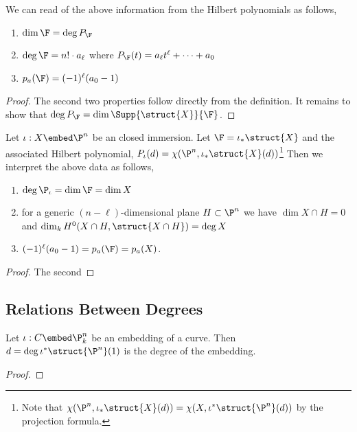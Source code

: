\documentclass[12pt]{article}
\begin{document}
\begin{lemma}
We can read of the above information from the Hilbert polynomials as follows,
\begin{enumerate}
\item $\dim{\F} = \deg{P_\F}$
\item $\deg{\F} = n! \cdot a_\ell$ where $P_\F(t) = a_\ell t^\ell + \cdots + a_0$
\item $p_a(\F) = (-1)^\ell (a_0 - 1)$
\end{enumerate}
\end{lemma}

\begin{proof}
The second two properties follow directly from the definition. It remains to show that $\deg{P_\F} = \dim{\Supp{\struct{X}}{\F}}$. 
\end{proof}

\begin{lemma}
Let $\iota : X \embed \P^n$ be an closed immersion. Let $\F = \iota_* \struct{X}$ and the associated Hilbert polynomial, $P_\iota(d) = \chi(\P^n, \iota_* \struct{X}(d))$\footnote{Note that $\chi(\P^n, \iota_* \struct{X}(d)) = \chi(X, \iota^* \struct{\P^n}(d))$ by the projection formula.} Then we interpret the above data as follows,
\begin{enumerate}
\item $\deg{\P_\iota} = \dim{\F} = \dim{X}$
\item for a generic $(n-\ell)$-dimensional plane $H \subset \P^n$ we have $\dim{X \cap H} = 0$ and $\dim_k H^0(X \cap H, \struct{X \cap H}) = \deg{X}$
\item $(-1)^\ell (a_0 - 1) = p_a(\F) = p_a(X)$.
\end{enumerate}
\end{lemma}

\begin{proof}
The second 
\end{proof}

\subsection{Relations Between Degrees}

\begin{prop}
Let $\iota : C \embed \P^n_k$ be an embedding of a curve. Then $d = \deg{\iota^* \struct{\P^n}(1)}$ is the degree of the embedding.
\end{prop}

\begin{proof}

\end{proof}
\end{document}
